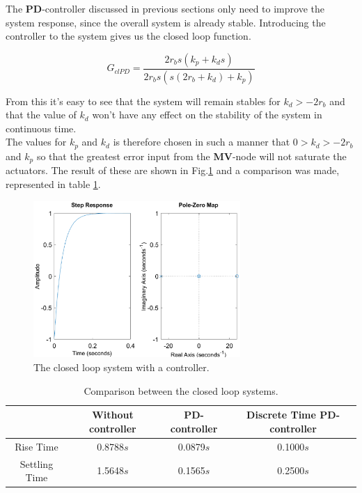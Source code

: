 \noindent The \textbf{PD}-controller discussed in previous sections only need to improve the system response, since the overall system is already stable. Introducing the controller to the system gives us the closed loop function.

\begin{equation}
    G_{clPD} = \frac{2r_b s(k_p + k_d s)}{2r_b s(s(2r_b+k_d)+k_p)}
\end{equation}

\noindent From this it's easy to see that the system will remain stables for $k_d > - 2 r_b$ and that the value of $k_d$ won't have any effect on the stability of the system in continuous time.\\
\indent The values for $k_p$ and $k_d$ is therefore chosen in such a manner that $ 0 > k_d > -2 r_b$ and $k_p$ so that the greatest error input from the \textbf{MV}-node will not saturate the actuators. The result of these are shown in Fig.\ref{fig:step2} and a comparison was made, represented in table \ref{tab:with_without}.

\begin{figure}[H]
    \centering
    \includegraphics[width= 0.7\textwidth]{img/closed_loop_step_PD.eps}
    \caption{The closed loop system with a controller.}
    \label{fig:step2}
\end{figure}

\begin{table}[H]
    \centering
    \caption{Comparison between the closed loop systems.}
    \begin{tabular}{|c|ccc|}
        \hline & Without controller & \textbf{PD}-controller & Discrete Time \textbf{PD}-controller \\
        \hline Rise Time & 0.8788$s$ & 0.0879$s$ & 0.1000$s$ \\ 
        Settling Time & 1.5648$s$ & 0.1565$s$ & 0.2500$s$ \\
        \hline
    \end{tabular}
    \label{tab:with_without}
\end{table}



